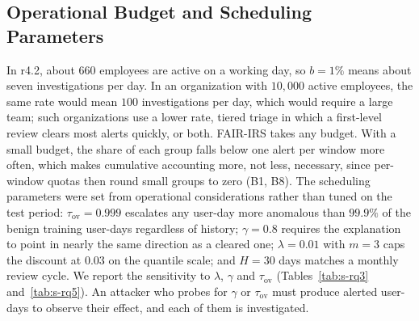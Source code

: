 \documentclass[10pt,onecolumn,letterpaper]{article}
\begin{document}
\subsection{Operational Budget and Scheduling Parameters}
In r4.2, about $660$ employees are active on a working day, so $b=1\%$ means about seven investigations per day. In an organization with $10{,}000$ active employees, the same rate would mean $100$ investigations per day, which would require a large team; such organizations use a lower rate, tiered triage in which a first-level review clears most alerts quickly, or both. FAIR-IRS takes any budget. With a small budget, the share of each group falls below one alert per window more often, which makes cumulative accounting more, not less, necessary, since per-window quotas then round small groups to zero (B1, B8). The scheduling parameters were set from operational considerations rather than tuned on the test period: $\tau_{\mathrm{ov}}=0.999$ escalates any user-day more anomalous than $99.9\%$ of the benign training user-days regardless of history; $\gamma=0.8$ requires the explanation to point in nearly the same direction as a cleared one; $\lambda=0.01$ with $m=3$ caps the discount at $0.03$ on the quantile scale; and $H=30$ days matches a monthly review cycle. We report the sensitivity to $\lambda$, $\gamma$ and $\tau_{\mathrm{ov}}$ (Tables~\ref{tab:s-rq3} and~\ref{tab:s-rq5}). An attacker who probes for $\gamma$ or $\tau_{\mathrm{ov}}$ must produce alerted user-days to observe their effect, and each of them is investigated.
\end{document}
